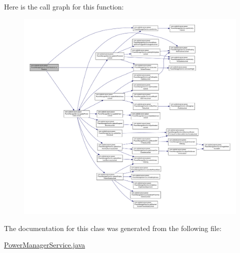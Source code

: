 Here is the call graph for this function\-:
\nopagebreak
\begin{figure}[H]
\begin{center}
\leavevmode
\includegraphics[width=350pt]{classcom_1_1android_1_1server_1_1power_1_1PowerManagerService_1_1DockReceiver_a3334dd3d85872e0b85df18c73b2d4af7_cgraph}
\end{center}
\end{figure}




The documentation for this class was generated from the following file\-:\begin{DoxyCompactItemize}
\item 
\hyperlink{PowerManagerService_8java}{Power\-Manager\-Service.\-java}\end{DoxyCompactItemize}
